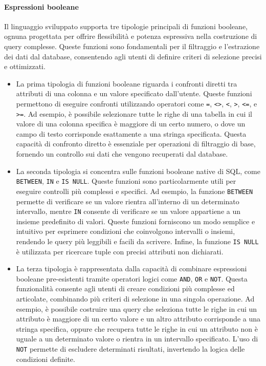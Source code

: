 \documentclass[12pt,a4paper,openright,twoside]{book}
\begin{document}
\paragraph{Espressioni booleane}
Il linguaggio sviluppato supporta tre tipologie principali di funzioni booleane, ognuna progettata per offrire flessibilità e 
potenza espressiva nella costruzione di query complesse. Queste funzioni sono fondamentali per il filtraggio e l’estrazione dei dati 
dal database, consentendo agli utenti di definire criteri di selezione precisi e ottimizzati.
\begin{itemize}
    \item La prima tipologia di funzioni booleane riguarda i confronti diretti tra attributi di una colonna e un valore specificato 
    dall’utente. Queste funzioni permettono di eseguire confronti utilizzando operatori come \texttt{=}, \texttt{<>}, \texttt{<}, \texttt{>}, \texttt{<=}, e \texttt{>=}. Ad esempio, è 
    possibile selezionare tutte le righe di una tabella in cui il valore di una colonna specifica è maggiore di un certo numero, o 
    dove un campo di testo corrisponde esattamente a una stringa specificata. Questa capacità di confronto diretto è essenziale per 
    operazioni di filtraggio di base, fornendo un controllo sui dati che vengono recuperati dal database.

    \item La seconda tipologia si concentra sulle funzioni booleane native di SQL, come \texttt{BETWEEN}, \texttt{IN} e \texttt{IS NULL}. Queste funzioni sono 
    particolarmente utili per eseguire controlli più complessi e specifici. Ad esempio, la funzione \texttt{BETWEEN} permette di verificare 
    se un valore rientra all’interno di un determinato intervallo, mentre \texttt{IN} consente di verificare se un valore appartiene a un 
    insieme predefinito di valori. Queste funzioni forniscono un modo semplice e intuitivo per esprimere condizioni che coinvolgono 
    intervalli o insiemi, rendendo le query più leggibili e facili da scrivere. Infine, la funzione \texttt{IS NULL} è utilizzata per 
    ricercare tuple con precisi attributi non dichiarati.

    \item La terza tipologia è rappresentata dalla capacità di combinare espressioni booleane pre-esistenti tramite operatori logici 
    come \texttt{AND}, \texttt{OR} e \texttt{NOT}. Questa funzionalità consente agli utenti di creare condizioni più complesse ed articolate, combinando più 
    criteri di selezione in una singola operazione. Ad esempio, è possibile costruire una query che seleziona tutte le righe in cui 
    un attributo è maggiore di un certo valore e un altro attributo corrisponde a una stringa specifica, oppure che recupera tutte 
    le righe in cui un attributo non è uguale a un determinato valore o rientra in un intervallo specificato. L’uso di \texttt{NOT} permette 
    di escludere determinati risultati, invertendo la logica delle condizioni definite.
\end{itemize}
\end{document}
